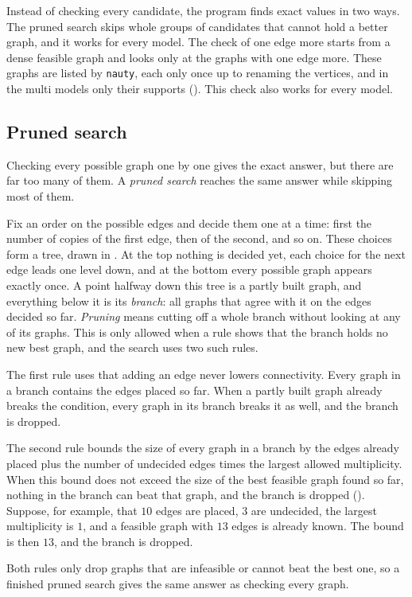 Instead of checking every candidate, the program finds exact values in two ways.
The pruned search skips whole groups of candidates that cannot hold a better graph, and it works for every model.
The check of one edge more starts from a dense feasible graph and looks only at the graphs with one edge more. These graphs are listed by \texttt{nauty}, each only once up to renaming the vertices, and in the multi models only their supports (). This check also works for every model.

\subsection{Pruned search}
Checking every possible graph one by one gives the exact answer, but there are far too many of them.
A \emph{pruned search} reaches the same answer while skipping most of them.

Fix an order on the possible edges and decide them one at a time: first the number of copies of the first edge, then of the second, and so on.
These choices form a tree, drawn in .
At the top nothing is decided yet, each choice for the next edge leads one level down, and at the bottom every possible graph appears exactly once.
A point halfway down this tree is a partly built graph, and everything below it is its \emph{branch}: all graphs that agree with it on the edges decided so far.
\emph{Pruning} means cutting off a whole branch without looking at any of its graphs.
This is only allowed when a rule shows that the branch holds no new best graph, and the search uses two such rules.

The first rule uses that adding an edge never lowers connectivity.
Every graph in a branch contains the edges placed so far. When a partly built graph already breaks the condition, every graph in its branch breaks it as well, and the branch is dropped.

The second rule bounds the size of every graph in a branch by the edges already placed plus the number of undecided edges times the largest allowed multiplicity.
When this bound does not exceed the size of the best feasible graph found so far, nothing in the branch can beat that graph, and the branch is dropped ().
Suppose, for example, that $10$ edges are placed, $3$ are undecided, the largest multiplicity is $1$, and a feasible graph with $13$ edges is already known. The bound is then $13$, and the branch is dropped.

Both rules only drop graphs that are infeasible or cannot beat the best one, so a finished pruned search gives the same answer as checking every graph.

